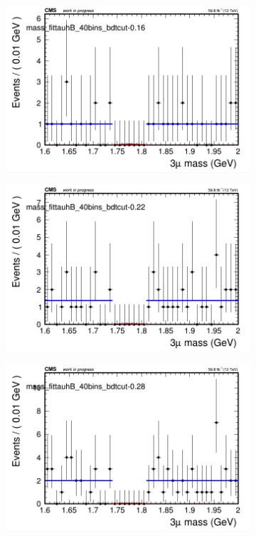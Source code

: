 \begin{figure}[H]
\begin{subfigure}{0.2\textwidth}
        \includegraphics[width=\textwidth]{flat_fit/plots/tauhB/massfit_tauhB_40bins_bdtcut-0.16.png}
        \caption{}
    \end{subfigure}
    \begin{subfigure}{0.2\textwidth}
        \includegraphics[width=\textwidth]{flat_fit/plots/tauhB/massfit_tauhB_40bins_bdtcut-0.22.png}
        \caption{}
    \end{subfigure}
    \begin{subfigure}{0.2\textwidth}
        \includegraphics[width=\textwidth]{flat_fit/plots/tauhB/massfit_tauhB_40bins_bdtcut-0.28.png}

\end{subfigure}
\end{figure}
